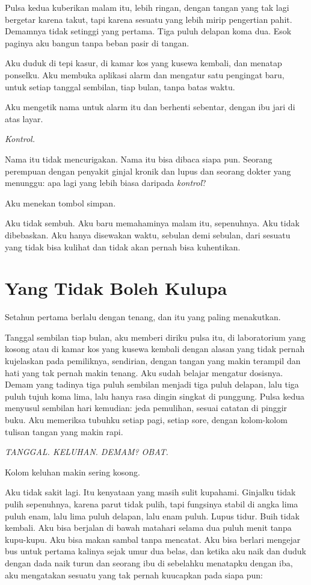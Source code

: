 \documentclass[11pt,twoside,openany]{book}
\begin{document}
Pulsa kedua kuberikan malam itu, lebih ringan, dengan tangan yang tak lagi bergetar karena takut, tapi karena sesuatu yang lebih mirip pengertian pahit. Demamnya tidak setinggi yang pertama. Tiga puluh delapan koma dua. Esok paginya aku bangun tanpa beban pasir di tangan.

Aku duduk di tepi kasur, di kamar kos yang kusewa kembali, dan menatap ponselku. Aku membuka aplikasi alarm dan mengatur satu pengingat baru, untuk setiap tanggal sembilan, tiap bulan, tanpa batas waktu.

Aku mengetik nama untuk alarm itu dan berhenti sebentar, dengan ibu jari di atas layar.

\emph{Kontrol.}

Nama itu tidak mencurigakan. Nama itu bisa dibaca siapa pun. Seorang perempuan dengan penyakit ginjal kronik dan lupus dan seorang dokter yang menunggu: apa lagi yang lebih biasa daripada \emph{kontrol}?

Aku menekan tombol simpan.

Aku tidak sembuh. Aku baru memahaminya malam itu, sepenuhnya. Aku tidak dibebaskan. Aku hanya disewakan waktu, sebulan demi sebulan, dari sesuatu yang tidak bisa kulihat dan tidak akan pernah bisa kuhentikan.

\chapter{Yang Tidak Boleh Kulupa}
Setahun pertama berlalu dengan tenang, dan itu yang paling menakutkan.

Tanggal sembilan tiap bulan, aku memberi diriku pulsa itu, di laboratorium yang kosong atau di kamar kos yang kusewa kembali dengan alasan yang tidak pernah kujelaskan pada pemiliknya, sendirian, dengan tangan yang makin terampil dan hati yang tak pernah makin tenang. Aku sudah belajar mengatur dosisnya. Demam yang tadinya tiga puluh sembilan menjadi tiga puluh delapan, lalu tiga puluh tujuh koma lima, lalu hanya rasa dingin singkat di punggung. Pulsa kedua menyusul sembilan hari kemudian: jeda pemulihan, sesuai catatan di pinggir buku. Aku memeriksa tubuhku setiap pagi, setiap sore, dengan kolom-kolom tulisan tangan yang makin rapi.

\emph{TANGGAL. KELUHAN. DEMAM? OBAT.}

Kolom keluhan makin sering kosong.

Aku tidak sakit lagi. Itu kenyataan yang masih sulit kupahami. Ginjalku tidak pulih sepenuhnya, karena parut tidak pulih, tapi fungsinya stabil di angka lima puluh enam, lalu lima puluh delapan, lalu enam puluh. Lupus tidur. Buih tidak kembali. Aku bisa berjalan di bawah matahari selama dua puluh menit tanpa kupu-kupu. Aku bisa makan sambal tanpa mencatat. Aku bisa berlari mengejar bus untuk pertama kalinya sejak umur dua belas, dan ketika aku naik dan duduk dengan dada naik turun dan seorang ibu di sebelahku menatapku dengan iba, aku mengatakan sesuatu yang tak pernah kuucapkan pada siapa pun:
\end{document}
